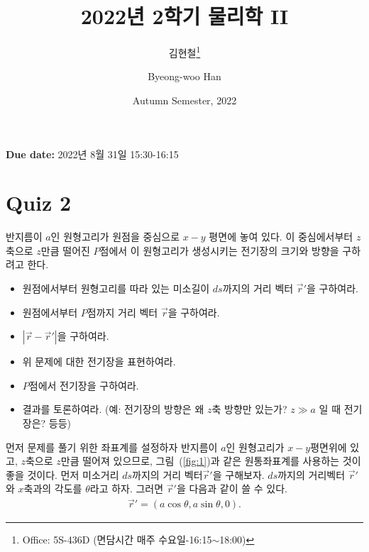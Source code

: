 \documentclass[tightenlines,floatfix,nofootinbib,superscriptaddress,fleqn]{revtex4-2}
\begin{document}
\title{\Large 2022년 2학기 물리학 II}
\author{김현철\footnote{Office: 5S-436D (면담시간 매주
    수요일-16:15$\sim$18:00)}} 
\author{Byeong-woo Han}
\date{Autumn Semester, 2022}

\maketitle

{\color{red} {\bf Due date:} 2022년 8월 31일  15:30-16:15 }
\vspace{1.cm}

\section*{\large Quiz 2}
반지름이 $a$인 원형고리가 원점을 중심으로 $x-y$ 평면에 놓여 있다.  
이 중심에서부터 $z$축으로 $z$만큼 떨어진 $P$점에서 이 원형고리가
생성시키는 전기장의 크기와 방향을 구하려고 한다.
\begin{itemize}
\item 원점에서부터 원형고리를 따라 있는 미소길이 $ds$까지의 거리 벡터
  $\vec{r}'$을 구하여라. 
\item 원점에서부터 $P$점까지 거리 벡터 $\vec{r}$을 구하여라.
\item $|\vec{r}-\vec{r}'|$을 구하여라. 
\item 위 문제에 대한 전기장을 표현하여라. 
\item $P$점에서 전기장을 구하여라. 
\item 결과를 토론하여라. (예: 전기장의 방향은 왜 $z$축 방향만 있는가?
  $z\gg a$ 일 때 전기장은? 등등)  
\end{itemize}
\vspace{1.cm}
먼저 문제를 풀기 위한 좌표계를 설정하자
반지름이 $a$인 원형고리가 $x-y$평면위에 있고,
$z$축으로 $z$만큼 떨어져 있으므로, 그림~(\ref{fig:1})과 같은
원통좌표계를 사용하는 것이 좋을 것이다. 먼저 미소거리 $ds$까지의 거리 벡터$\vec{r}'$을 구해보자.
$ds$까지의 거리벡터 $\vec{r}'$와 $x$축과의 각도를 $\theta$라고 하자.
그러면 $\vec{r}'$을 다음과 같이 쓸 수 있다.
\begin{align}
  \vec{r}'=\left(a\cos{\theta},a\sin{\theta},0\right).
\end{align}
\end{document}
